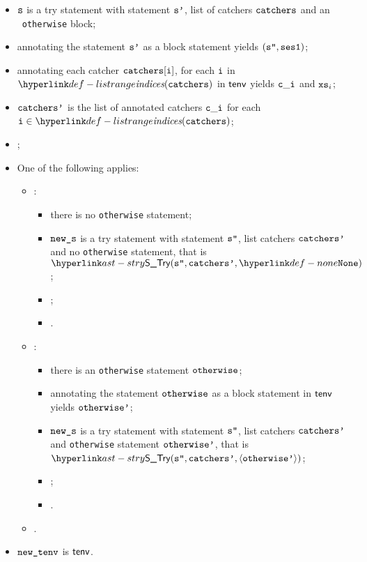 \begin{itemize}
  \item $\texttt{s}$ is a try statement with statement $\texttt{s'}$, list of catchers $\texttt{catchers}$ and an \optional\ \texttt{otherwise} block;
  \item annotating the statement $\texttt{s'}$ as a block statement yields $(\texttt{s''}, \texttt{ses1})$\ProseOrTypeError;
  \item annotating each catcher $\texttt{catchers}[\texttt{i}]$, for each $\texttt{i}$ in $\listrange(\catchers)$ in $\textsf{tenv}$ yields $\texttt{c}\_\texttt{i}$
        and $\texttt{xs}_i$\ProseOrTypeError;
  \item $\texttt{catchers'}$ is the list of annotated catchers $\texttt{c}\_\texttt{i}$ for each $\vi\in\listrange(\catchers)$;
  \item {};
  \item One of the following applies:
  \begin{itemize}
    \item {}:
    \begin{itemize}
      \item there is no \texttt{otherwise} statement;
      \item $\texttt{new\_s}$ is a try statement with statement $\texttt{s''}$, list catchers $\texttt{catchers'}$ and no \texttt{otherwise} statement,
            that is \\
            $\STry(\vspp, \catchersp, \None)$;
      \item {};
      \item \Proseeqdef{$\vsesthree$}{$\vsestwo$}.
    \end{itemize}

    \item {}:
    \begin{itemize}
      \item there is an \texttt{otherwise} statement $\texttt{otherwise}$;
      \item annotating the statement $\texttt{otherwise}$ as a block statement in $\textsf{tenv}$ yields $\texttt{otherwise'}$\ProseOrTypeError;
      \item $\texttt{new\_s}$ is a try statement with statement $\texttt{s''}$, list catchers $\texttt{catchers'}$ and \texttt{otherwise} statement
            $\texttt{otherwise'}$, that is \\
            $\STry(\vspp, \catchersp, \langle\otherwisep\rangle)$;
      \item \Proseeqdef{$\vsesotherwise$}{$\vsesblock$};
      \item {}.
    \end{itemize}

    \item {}.
  \end{itemize}
  \item $\texttt{new\_tenv}$ is $\textsf{tenv}$.
\end{itemize}

